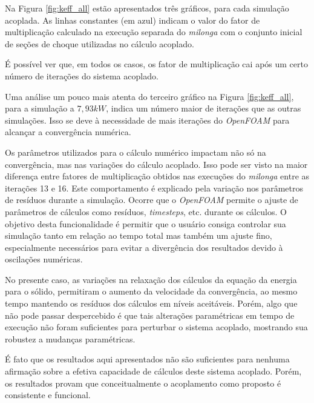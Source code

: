Na Figura \ref{fig:keff_all} estão apresentados três gráficos, para cada simulação
acoplada. As linhas constantes (em azul) indicam o valor do fator de multiplicação
calculado na execução separada do \textit{milonga} com o conjunto inicial de seções
de choque utilizadas no cálculo acoplado.

É possível ver que, em todos os casos, os fator de multiplicação cai após
um certo número de iterações do sistema acoplado.

Uma análise um pouco mais atenta do terceiro gráfico na Figura \ref{fig:keff_all},
para a simulação a $7,93 kW$, indica um número maior de iterações que as outras simulações.
Isso se deve à necessidade de mais iterações do \textit{OpenFOAM} para alcançar a convergência
numérica.

Os parâmetros utilizados para o cálculo numérico impactam não só na convergência, mas
nas variações do cálculo acoplado. Isso pode ser visto na maior diferença entre
fatores de multiplicação obtidos nas execuções do \textit{milonga} entre as
iterações 13 e 16. Este comportamento é explicado pela variação nos parâmetros
de resíduos durante a simulação. Ocorre que o \textit{OpenFOAM} permite o ajuste
de parâmetros de cálculos como resíduos, \textit{timesteps}, etc. durante os cálculos.
O objetivo desta funcionalidade é permitir que o usuário consiga controlar sua simulação
tanto em relação ao tempo total mas também um ajuste fino, especialmente necessários
para evitar a divergência dos resultados devido à oscilações numéricas.

No presente caso, as variações na relaxação dos cálculos da equação da energia para
o sólido, permitiram o aumento da velocidade da convergência, ao mesmo tempo mantendo
os resíduos dos cálculos em níveis aceitáveis. Porém, algo que não pode passar despercebido
é que tais alterações paramétricas em tempo de execução não foram suficientes para
perturbar o sistema acoplado, mostrando sua robustez a mudanças paramétricas.

É fato que os resultados aqui apresentados não são suficientes para nenhuma afirmação
sobre a efetiva capacidade de cálculos deste sistema acoplado. Porém, os resultados
provam que conceitualmente o acoplamento como proposto é consistente e funcional.
